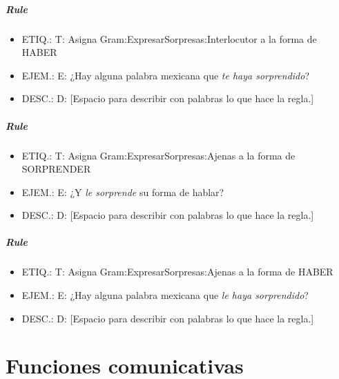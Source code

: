 \documentclass[11pt]{report}
\begin{document}
\paragraph*{Rule}
\begin{itemize}
\item ETIQ.:  T: Asigna Gram:ExpresarSorpresas:Interlocutor a la forma de HABER
\item EJEM.:  E: ¿Hay alguna palabra mexicana que \emph{te haya sorprendido}?
\item DESC.:  D: [Espacio para describir con palabras lo que hace la regla.]
\end{itemize}

\paragraph*{Rule}
\begin{itemize}
\item ETIQ.:  T: Asigna Gram:ExpresarSorpresas:Ajenas a la forma de SORPRENDER
\item EJEM.:  E: ¿Y \emph{le sorprende} su forma de hablar?
\item DESC.:  D: [Espacio para describir con palabras lo que hace la regla.]
\end{itemize}

\paragraph*{Rule}
\begin{itemize}
\item ETIQ.:  T: Asigna Gram:ExpresarSorpresas:Ajenas a la forma de HABER
\item EJEM.:  E: ¿Hay alguna palabra mexicana que \emph{le haya sorprendido}?
\item DESC.:  D: [Espacio para describir con palabras lo que hace la regla.]
\end{itemize}

\chapter{Funciones comunicativas}
\end{document}
